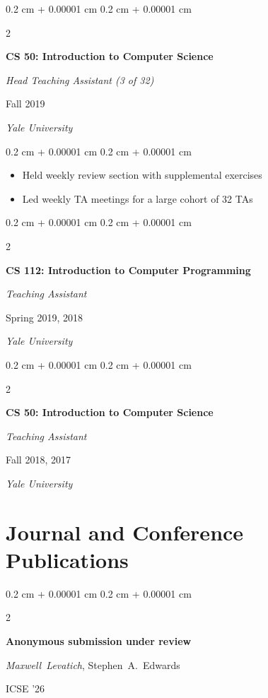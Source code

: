\documentclass[10pt, letterpaper]{article}
\newenvironment{highlights}{
    \begin{itemize}[
        topsep=0.05 cm,
        parsep=0.05 cm,
        partopsep=0pt,
        itemsep=0pt,
        leftmargin=0.4 cm + 10pt
    ]
}{
    \end{itemize}
} %
\newenvironment{onecolentry}{
    \begin{adjustwidth}{
        0.2 cm + 0.00001 cm
    }{
        0.2 cm + 0.00001 cm
    }
}{
    \end{adjustwidth}
} %
\newenvironment{twocolentry}[2][]{
    \onecolentry
    \def\secondColumn{#2}
    \setcolumnwidth{\fill, 5.5 cm}
    \begin{paracol}{2}
}{
    \switchcolumn \raggedleft \secondColumn
    \end{paracol}
    \endonecolentry
} %
\begin{document}
        \vspace{0.4 cm}

        \begin{twocolentry}{Fall 2019
            
            \textit{Yale University}}
            \textbf{CS 50: Introduction to Computer Science}
            
            \textit{Head Teaching Assistant (3 of 32)}
        \end{twocolentry}

        \vspace{0.10 cm}
        \begin{onecolentry}
            \begin{highlights}
                \item Held weekly review section with supplemental exercises
                \item Led weekly TA meetings for a large cohort of 32 TAs
            \end{highlights}
        \end{onecolentry}

        \vspace{0.4 cm}

        \begin{twocolentry}{Spring 2019, 2018
            
            \textit{Yale University}}
            \textbf{CS 112: Introduction to Computer Programming}
            
            \textit{Teaching Assistant}
        \end{twocolentry}

        \vspace{0.4 cm}

        \begin{twocolentry}{Fall 2018, 2017
            
            \textit{Yale University}}
            \textbf{CS 50: Introduction to Computer Science}
            
            \textit{Teaching Assistant}
        \end{twocolentry}
        
    \section{Journal and Conference Publications}

        \begin{twocolentry}{ICSE '26}
            \textbf{Anonymous submission under review}

            \mbox{{\textit{Maxwell Levatich}}}, \mbox{Stephen A. Edwards}
        \end{twocolentry}
\end{document}
